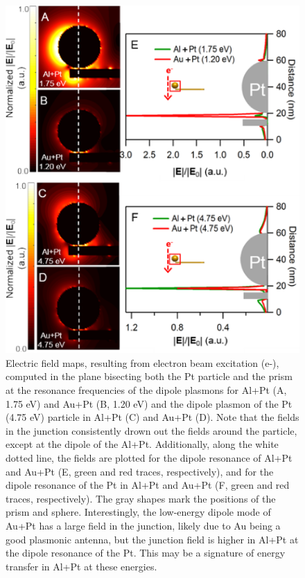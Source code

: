 \documentclass [11pt, proquest] {uwthesis}[2016/11/22]
\begin{document}
\begin{figure}
\begin{centering}
\includegraphics{prisms_fields_2.png}
\caption{Electric field maps, resulting from electron beam excitation (e-), computed in the plane bisecting both the Pt particle and the prism at the resonance frequencies of the dipole plasmons for Al+Pt (A, 1.75 eV) and Au+Pt (B, 1.20 eV) and the dipole plasmon of the Pt (4.75 eV) particle in Al+Pt (C) and Au+Pt (D). Note that the fields in the junction consistently drown out the fields around the particle, except at the dipole of the Al+Pt.
Additionally, along the white dotted line, the fields are plotted for the dipole resonance of Al+Pt and Au+Pt (E, green and red traces, respectively), and for the dipole resonance of the Pt in Al+Pt and Au+Pt (F, green and red traces, respectively). The gray shapes mark the positions of the prism and sphere. Interestingly, the low-energy dipole mode of Au+Pt has a large field in the junction, likely due to Au being a good plasmonic antenna, but the junction field is higher in Al+Pt at the dipole resonance of the Pt. This may be a signature of energy transfer in Al+Pt at these energies.}
\label{field_side}
\end{centering}
\end{figure}
\end{document}
